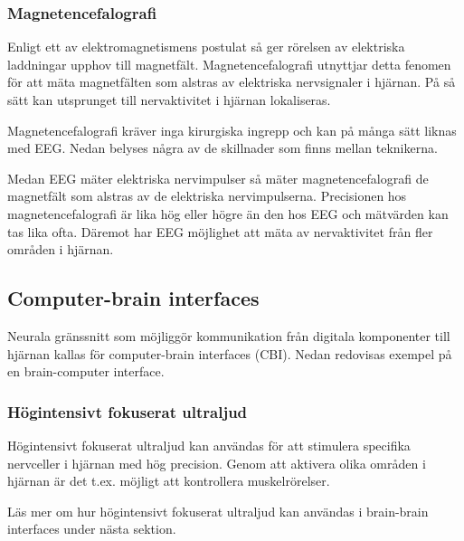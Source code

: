 \documentclass[12pt, a4paper]{article}
\begin{document}
\subsubsection{Magnetencefalografi}

Enligt ett av elektromagnetismens postulat så ger rörelsen av elektriska
laddningar upphov till magnetfält. \cite{electromagnetism} Magnetencefalografi
utnyttjar detta fenomen för att mäta magnetfälten som alstras av elektriska
nervsignaler i hjärnan. På så sätt kan utsprunget till nervaktivitet i hjärnan
lokaliseras.

Magnetencefalografi kräver inga kirurgiska ingrepp och kan på många sätt liknas
med EEG. Nedan belyses några av de skillnader som finns mellan teknikerna.

Medan EEG mäter elektriska nervimpulser så mäter magnetencefalografi de
magnetfält som alstras av de elektriska nervimpulserna. Precisionen hos
magnetencefalografi är lika hög eller högre än den hos EEG och mätvärden kan tas
lika ofta. Däremot har EEG möjlighet att mäta av nervaktivitet från fler områden
i hjärnan. \cite{meg_eeg}

%
%

\subsection{Computer-brain interfaces}

Neurala gränssnitt som möjliggör kommunikation från digitala komponenter till
hjärnan kallas för computer-brain interfaces (CBI). Nedan redovisas exempel på
en brain-computer interface.

\subsubsection{Högintensivt fokuserat ultraljud}
Högintensivt fokuserat ultraljud kan användas för att stimulera specifika
nervceller i hjärnan med hög precision. Genom att aktivera olika områden i
hjärnan är det t.ex. möjligt att kontrollera muskelrörelser. \cite{bbi}

Läs mer om hur högintensivt fokuserat ultraljud kan användas i brain-brain
interfaces under nästa sektion.
\end{document}
